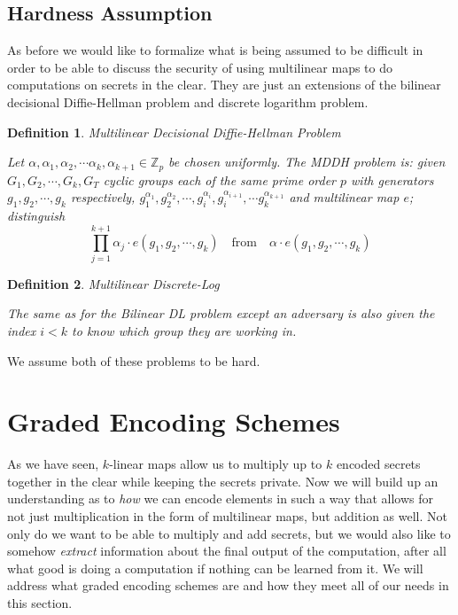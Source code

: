 \documentclass[12pt,twoside]{reedthesis}
\newtheorem{definition}{Definition}
\newcommand{\Z}[0]{\mathbb{Z}}
\begin{document}
 \subsection{Hardness Assumption}
 
 As before we would like to formalize what is being assumed to be difficult in order to be able to discuss the security of using multilinear maps to do computations on secrets in the clear. They are just an extensions of the bilinear decisional Diffie-Hellman problem and discrete logarithm problem.
 
 
 \begin{definition}{Multilinear Decisional Diffie-Hellman Problem} 
\par Let $\alpha,\alpha_1,\alpha_2,\cdots \alpha_k, \alpha_{k+1} \in \Z_p$ be chosen uniformly. The MDDH problem is: given $G_1,G_2, \cdots, G_k,G_T$ cyclic groups each of the same prime order $p$ with generators $g_1,g_2,\cdots, g_k$ respectively, $g_1^{\alpha_1}, g_2^{\alpha_2}, \cdots, g_i^{\alpha_i} , g_i^{\alpha_{i+1}},\cdots g_k^{\alpha_{k+1}}$ and multilinear map $e$; distinguish 
$$\prod_{j=1}^{k+1}\alpha_j \cdot e(g_1,g_2,\cdots,g_k)  \quad \text{from} \quad \alpha \cdot e(g_1,g_2,\cdots ,g_k)$$
 \end{definition}    
 
  \begin{definition}{Multilinear Discrete-Log} \par
 The same as for the Bilinear DL problem except an adversary is also given the index $i<k$ to know which group they are working in.
 \end{definition}
  

\par We assume both of these problems to be hard.

            
    
    \section{Graded Encoding Schemes}
    
    As we have seen, $k$-linear maps allow us to multiply up to $k$ encoded secrets together in the clear while keeping the secrets private. Now we will build up an understanding as to \textit{how} we can encode elements in such a way that allows for not just multiplication in the form of multilinear maps, but addition as well. Not only do we want to be able to multiply and add secrets, but we would also like to somehow \textit{extract} information about the final output of the computation, after all what good is doing a computation if nothing can be learned from it. We will address what graded encoding schemes are and how they meet all of our needs in this section. 
      
\end{document}
